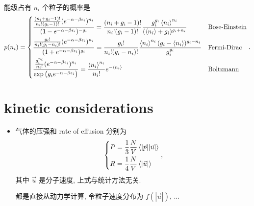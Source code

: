 \begin{itemize}
	\begin{tcolorbox}[title=calculation:]
		能级占有 $n_i$ 个粒子的概率是
		\begin{equation}
			p(n_i) = \begin{dcases}
				\frac{\frac{(n_i + g_i - 1)!}{n_i! (g_i - 1)!} (e^{- \alpha - \beta \epsilon_i})^{n_i}}{(1 - e^{- \alpha - \beta \epsilon_i})^{- g_i}} = \frac{(n_i + g_i - 1)!}{n_i! (g_i - 1)!} \frac{g_i^{g_i} \braket{n_i}^{n_i}}{(\braket{n_i} + g_i)^{g_i + n_i}} & \text{Bose-Einstein} \\
				\frac{\frac{g_i!}{n_i! (g_i - n_i)!} (e^{- \alpha - \beta \epsilon_i})^{n_i}}{(1 + e^{- \alpha - \beta \epsilon_i})^{g_i}} = \frac{g_i!}{n_i! (g_i - n_i)!} \frac{\braket{n_i}^{n_i} (g_i - \braket{n_i})^{g_i - n_i}}{g_i^{g_i}} & \text{Fermi-Dirac} \\
				\frac{\frac{g_i^{n_i}}{n_i!} (e^{- \alpha - \beta \epsilon_i})^{n_i}}{\exp \big( g_i e^{- \alpha - \beta \epsilon_i} \big)} = \frac{\braket{n_i}^{n_i}}{n_i!} e^{- \braket{n_i}} & \text{Boltzmann}
			\end{dcases}.
		\end{equation}
	\end{tcolorbox}
\end{itemize}

\section{kinetic considerations}
\begin{itemize}
	\item 气体的压强和 rate of effusion 分别为
	\begin{equation}
		\begin{dcases}
			P = \frac{1}{3} \frac{N}{V} \braket{|\vec{p}| |\vec{u}|} \\
			R = \frac{1}{4} \frac{N}{V} \braket{|\vec{u}|}
		\end{dcases},
	\end{equation}
	其中 $\vec{u}$ 是分子速度, 上式与统计方法无关.
	
	\begin{tcolorbox}[title=calculation:]
		都是直接从动力学计算, 令粒子速度分布为 $f(|\vec{u}|)$, ...
	\end{tcolorbox}
\end{itemize}

